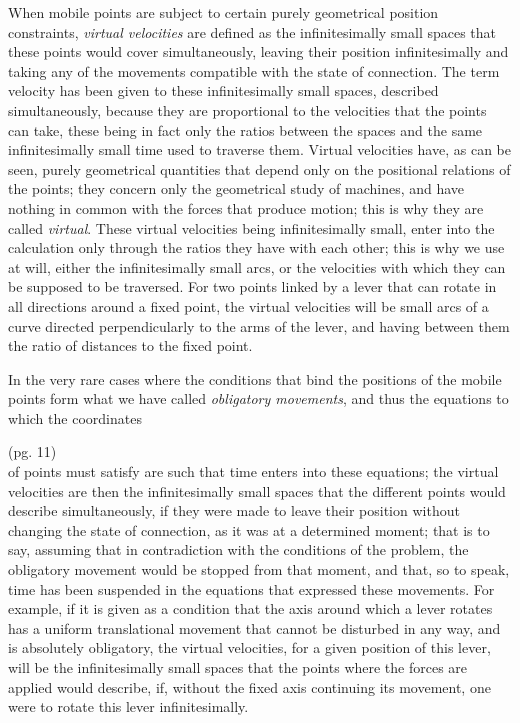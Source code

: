 \documentclass{book}
\begin{document}
When mobile points are subject to certain purely geometrical position constraints, \textit{virtual velocities} are defined as the infinitesimally small spaces that these points would cover simultaneously, leaving their position infinitesimally and taking any of the movements compatible with the state of connection. The term velocity has been given to these infinitesimally small spaces, described simultaneously, because they are proportional to the velocities that the points can take, these being in fact only the ratios between the spaces and the same infinitesimally small time used to traverse them. Virtual velocities have, as can be seen, purely geometrical quantities that depend only on the positional relations of the points; they concern only the geometrical study of machines, and have nothing in common with the forces that produce motion; this is why they are called \textit{virtual}. These virtual velocities being infinitesimally small, enter into the calculation only through the ratios they have with each other; this is why we use at will, either the infinitesimally small arcs, or the velocities with which they can be supposed to be traversed. For two points linked by a lever that can rotate in all directions around a fixed point, the virtual velocities will be small arcs of a curve directed perpendicularly to the arms of the lever, and having between them the ratio of distances to the fixed point.

In the very rare cases where the conditions that bind the positions of the mobile points form what we have called \textit{obligatory movements}, and thus the equations to which the coordinates 

\newpage
(pg. 11)\\
of points must satisfy are such that time enters into these equations; the virtual velocities are then the infinitesimally small spaces that the different points would describe simultaneously, if they were made to leave their position without changing the state of connection, as it was at a determined moment; that is to say, assuming that in contradiction with the conditions of the problem, the obligatory movement would be stopped from that moment, and that, so to speak, time has been suspended in the equations that expressed these movements. For example, if it is given as a condition that the axis around which a lever rotates has a uniform translational movement that cannot be disturbed in any way, and is absolutely obligatory, the virtual velocities, for a given position of this lever, will be the infinitesimally small spaces that the points where the forces are applied would describe, if, without the fixed axis continuing its movement, one were to rotate this lever infinitesimally.
\end{document}
